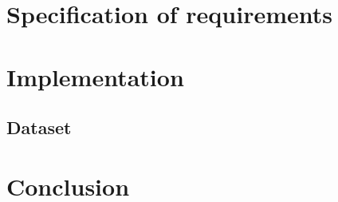 \documentclass[10pt,oneside,english,a4paper]{article}
\begin{document}

\clearpage
\section{Specification of requirements}

\clearpage{}
\section{Implementation}

\subsection{Dataset}


\clearpage{}
\section{Conclusion}


\clearpage
\thispagestyle{empty}
\mbox{}
\clearpage








\clearpage 
\normalsize 
 
 
\nocite{*}
\end{document}
